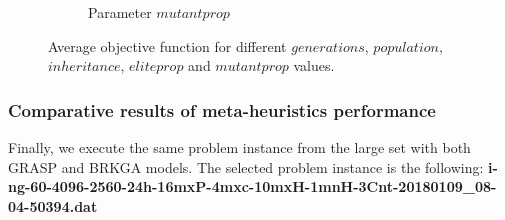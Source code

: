 \begin{figure}[H]
\begin{subfigure}[b]{.49\linewidth}
\caption{Parameter $mutantprop$ }\label{fig2e}
\end{subfigure}%
\caption{Average objective function for different  $generations$,  $population$,  $inheritance$,  $eliteprop$ and  $mutantprop$ values.  }
\label{fig_brkga_params}
\end{figure}





\subsubsection{Comparative results of meta-heuristics performance}


Finally, we execute the same problem instance from the large set with both GRASP and BRKGA models. The selected problem instance is the following: \textbf{i-ng-60-4096-2560-24h-16mxP-4mxc-10mxH-1mnH-3Cnt-20180109\_08-04-50394.dat }


